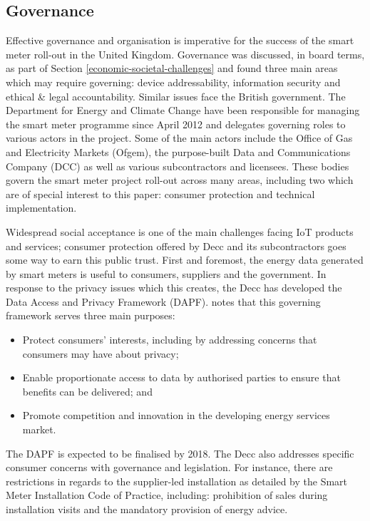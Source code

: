     \subsection{Governance}
      Effective governance and organisation is imperative for the success of the smart meter roll-out in the United Kingdom. Governance was discussed, in board terms, as part of Section \ref{economic-societal-challenges} and found three main areas which may require governing: device addressability, information security and ethical \& legal accountability. Similar issues face the British government. The Department for Energy and Climate Change have been responsible for managing the smart meter programme since April 2012 and delegates governing roles to various actors in the project. Some of the main actors include the Office of Gas and Electricity Markets (Ofgem), the purpose-built Data and Communications Company (DCC) as well as various subcontractors and licensees. These bodies govern the smart meter project roll-out across many areas, including two which are of special interest to this paper: consumer protection and technical implementation.

      Widespread social acceptance is one of the main challenges facing IoT products and services; consumer protection offered by Decc and its subcontractors goes some way to earn this public trust. First and foremost, the energy data generated by smart meters is useful to consumers, suppliers and the government. In response to the privacy issues which this creates, the Decc has developed the Data Access and Privacy Framework (DAPF). \citet{DataAccess:2015} notes that this governing framework serves three main purposes:

      \begin{itemize}
        \item{Protect consumers’ interests, including by addressing concerns that consumers may have about privacy;}
        \item{Enable proportionate access to data by authorised parties to ensure that benefits can be delivered; and}
        \item{Promote competition and innovation in the developing energy services market.}
      \end{itemize}

      The DAPF is expected to be finalised by 2018. The Decc also addresses specific consumer concerns with governance and legislation. For instance, there are restrictions in regards to the supplier-led installation as detailed by the Smart Meter Installation Code of Practice, including: prohibition of sales during installation visits and the mandatory provision of energy advice.

